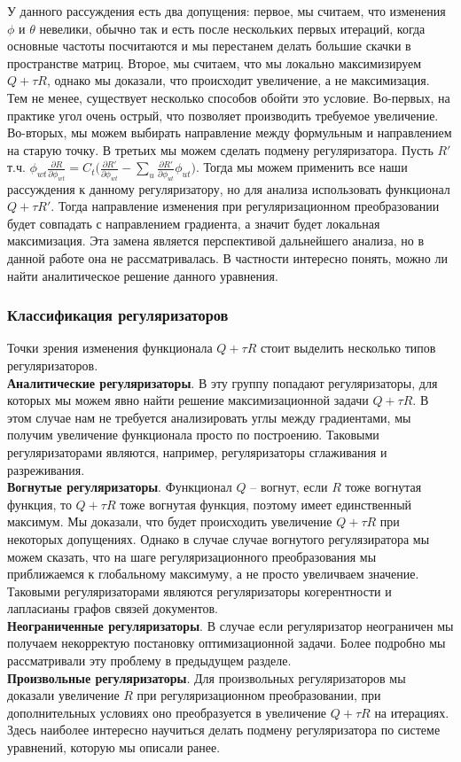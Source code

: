 \documentclass[12pt]{article}
\begin{document}
У данного рассуждения есть два допущения: первое, мы считаем, что изменения $\phi$ и $\theta$ невелики, обычно так и есть после нескольких первых итераций, когда основные частоты посчитаются и мы  перестанем делать большие скачки в пространстве матриц. Второе, мы считаем, что мы локально максимизируем $Q + \tau R$, однако мы доказали, что происходит увеличение, а не максимизация. Тем не менее, существует несколько способов обойти это условие. Во-первых, на практике угол очень острый, что позволяет производить требуемое увеличение. Во-вторых, мы можем выбирать направление между формульным и направлением на старую точку. В третьих мы можем сделать подмену регуляризатора. Пусть $R'$ т.ч. $\phi_{wt}\frac{\partial{R}}{\partial{\phi_{wt}}} = C_t \bigg( \frac{\partial{R'}}{\partial{\phi_{wt}}} - \sum_{u}  \frac{\partial{R'}}{\partial{\phi_{ut}}} \phi_{ut} \bigg)$. Тогда мы можем применить все наши рассуждения к данному регуляризатору, но для анализа использовать функционал $Q + \tau R'$. Тогда направление изменения при регуляризационном преобразовании будет совпадать с направлением градиента, а значит будет локальная максимизация.  Эта замена является перспективой дальнейшего анализа, но в данной работе она не рассматривалась. В частности интересно понять, можно ли найти аналитическое решение данного уравнения.
           \subsubsection{Классификация регуляризаторов}
Точки зрения изменения функционала $Q + \tau R$ стоит выделить несколько типов регуляризаторов.\\
	 \textbf{Аналитические регуляризаторы}. В эту группу попадают регуляризаторы, для которых мы можем явно найти решение максимизационной задачи $Q + \tau R$. В этом случае нам не требуется анализировать углы между градиентами, мы получим увеличение функционала просто по построению. Таковыми регуляризаторами являются, например, регуляризаторы сглаживания и разреживания.\\ 
	\textbf{Вогнутые регуляризаторы}. Функционал $Q$ -- вогнут, если $R$ тоже вогнутая функция, то $Q + \tau R$ тоже вогнутая функция, поэтому имеет единственный максимум. Мы доказали, что будет происходить увеличение $Q + \tau R$ при некоторых допущениях. Однако в случае случае вогнутого регулязиратора мы можем сказать, что на шаге регуляризационного преобразования мы приближаемся к глобальному максимуму, а не просто увеличваем значение. Таковыми регуляризаторами являются регуляризаторы когерентности и лапласианы графов связей документов.\\
	\textbf{Неограниченные регуляризаторы}. В случае если регуляризатор неограничен мы получаем некорректую постановку оптимизационной задачи. Более подробно мы рассматривали эту проблему в предыдущем разделе.\\
	\textbf{Произвольные регуляризаторы}. Для произвольных регуляризаторов мы доказали увеличение $R$ при регуляризационном преобразовании, при дополнительных условиях оно преобразуется в увеличение $Q + \tau R$ на итерациях. Здесь наиболее интересно научиться делать подмену регуляризатора по системе уравнений, которую мы описали ранее.
\end{document}
